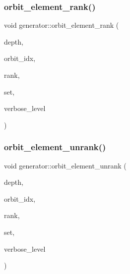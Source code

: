 \mbox{\label{classgenerator_a98e10a923dffa737fdb6ebc703d53fae}} 
\subsubsection{\texorpdfstring{orbit\+\_\+element\+\_\+rank()}{orbit\_element\_rank()}}
{\footnotesize\ttfamily void generator\+::orbit\+\_\+element\+\_\+rank (\begin{DoxyParamCaption}\item[{\mbox{\hyperlink{galois_8h_a09fddde158a3a20bd2dcadb609de11dc}{I\+NT}}}]{depth,  }\item[{\mbox{\hyperlink{galois_8h_a09fddde158a3a20bd2dcadb609de11dc}{I\+NT}} \&}]{orbit\+\_\+idx,  }\item[{\mbox{\hyperlink{galois_8h_a09fddde158a3a20bd2dcadb609de11dc}{I\+NT}} \&}]{rank,  }\item[{\mbox{\hyperlink{galois_8h_a09fddde158a3a20bd2dcadb609de11dc}{I\+NT}} $\ast$}]{set,  }\item[{\mbox{\hyperlink{galois_8h_a09fddde158a3a20bd2dcadb609de11dc}{I\+NT}}}]{verbose\+\_\+level }\end{DoxyParamCaption})}

\mbox{\label{classgenerator_a26a8d0b1964170e19dcbd37fa0a4957f}} 
\subsubsection{\texorpdfstring{orbit\+\_\+element\+\_\+unrank()}{orbit\_element\_unrank()}}
{\footnotesize\ttfamily void generator\+::orbit\+\_\+element\+\_\+unrank (\begin{DoxyParamCaption}\item[{\mbox{\hyperlink{galois_8h_a09fddde158a3a20bd2dcadb609de11dc}{I\+NT}}}]{depth,  }\item[{\mbox{\hyperlink{galois_8h_a09fddde158a3a20bd2dcadb609de11dc}{I\+NT}}}]{orbit\+\_\+idx,  }\item[{\mbox{\hyperlink{galois_8h_a09fddde158a3a20bd2dcadb609de11dc}{I\+NT}}}]{rank,  }\item[{\mbox{\hyperlink{galois_8h_a09fddde158a3a20bd2dcadb609de11dc}{I\+NT}} $\ast$}]{set,  }\item[{\mbox{\hyperlink{galois_8h_a09fddde158a3a20bd2dcadb609de11dc}{I\+NT}}}]{verbose\+\_\+level }\end{DoxyParamCaption})}

